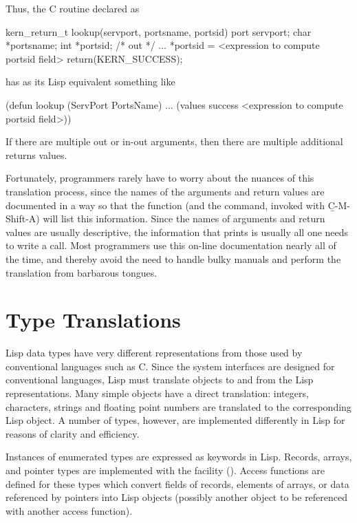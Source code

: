 Thus, the C routine declared as

\begin{example}
kern_return_t lookup(servport, portsname, portsid)
        port        servport;
        char        *portsname;
        int        *portsid;        /* out */
 {
  ...
  *portsid = <expression to compute portsid field>
  return(KERN_SUCCESS);
 }
\end{example}

has as its Lisp equivalent something like

\begin{lisp}
(defun lookup (ServPort PortsName)
  ...
  (values
   success
   <expression to compute portsid field>))
\end{lisp}

If there are multiple out or in-out arguments, then there are multiple
additional returns values.

Fortunately, \cmucl{} programmers rarely have to worry about the
nuances of this translation process, since the names of the arguments and
return values are documented in a way so that the  function
(and the \hemlock{}  command, invoked with
\b{C-M-Shift-A}) will list this information.  Since the names of arguments
and return values are usually descriptive, the information that
 prints is usually all one needs to write a
call. Most programmers use this on-line documentation nearly
all of the time, and thereby avoid the need to handle bulky
manuals and perform the translation from barbarous tongues.


\section{Type Translations}

Lisp data types have very different representations from those used by
conventional languages such as C.  Since the system interfaces are
designed for conventional languages, Lisp must translate objects to and
from the Lisp representations.  Many simple objects have a direct
translation: integers, characters, strings and floating point numbers
are translated to the corresponding Lisp object.  A number of types,
however, are implemented differently in Lisp for reasons of clarity and
efficiency.

Instances of enumerated types are expressed as keywords in Lisp.
Records, arrays, and pointer types are implemented with the \alien{}
facility ().  Access functions are defined
for these types which convert fields of records, elements of arrays,
or data referenced by pointers into Lisp objects (possibly another
object to be referenced with another access function).

